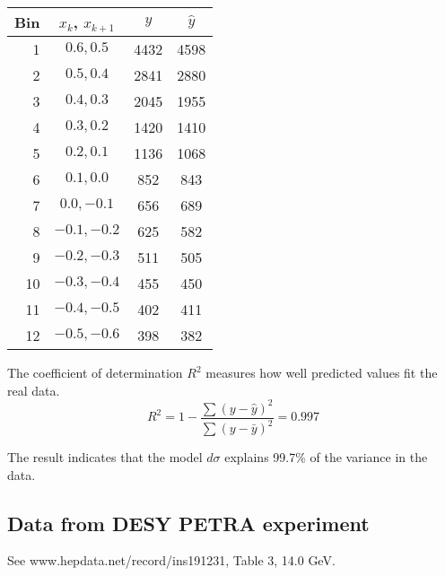 \documentclass[12pt]{article}
\begin{document}
\begin{center}
\begin{tabular}{|r|c|c|c|}
\hline
Bin & $x_k$, $x_{k+1}$ & $y$ & $\hat{y}$ \\
\hline
1 & $0.6, 0.5$ & 4432 & 4598\\
2 & $0.5, 0.4$ & 2841 & 2880\\
3 & $0.4, 0.3$ & 2045 & 1955\\
4 & $0.3, 0.2$ & 1420 & 1410\\
5 & $0.2, 0.1$ & 1136 & 1068\\
6 & $0.1, 0.0$ & 852 & 843\\
7 & $0.0, -0.1$ & 656 & 689\\
8 & $-0.1, -0.2$ & 625 & 582\\
9 & $-0.2, -0.3$ & 511 & 505\\
10 & $-0.3, -0.4$ & 455 & 450\\
11 & $-0.4, -0.5$ & 402 & 411\\
12 & $-0.5, -0.6$ & 398 & 382\\
\hline
\end{tabular}
\end{center}

\noindent
The coefficient of determination $R^2$ measures how well predicted values fit the real data.
\begin{equation*}
R^2=1-\frac{\sum(y-\hat{y})^2}{\sum(y-\bar{y})^2}=0.997
\end{equation*}

\noindent
The result indicates that the model $d\sigma$ explains
99.7\% of the variance in the data.

\subsection*{Data from DESY PETRA experiment}
See www.hepdata.net/record/ins191231, Table 3, 14.0 GeV.
\end{document}
